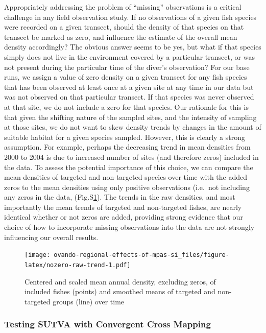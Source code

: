 \documentclass[]{article}
\begin{document}
Appropriately addressing the problem of ``missing'' observations is a critical challenge in any field observation study. If no observations of a given fish species were recorded on a given transect, should the density of that species on that transect be marked as zero, and influence the estimate of the overall mean density accordingly? The obvious answer seems to be yes, but what if that species simply does not live in the environment covered by a particular transect, or was not present during the particular time of the diver's observation? For our base runs, we assign a value of zero density on a given transect for any fish species that has been observed at least once at a given site at any time in our data but was not observed on that particular transect. If that species was never observed at that site, we do not include a zero for that species. Our rationale for this is that given the shifting nature of the sampled sites, and the intensity of sampling at those sites, we do not want to skew density trends by changes in the amount of suitable habitat for a given species sampled. However, this is clearly a strong assumption. For example, perhaps the decreasing trend in mean densities from 2000 to 2004 is due to increased number of sites (and therefore zeros) included in the data. To assess the potential importance of this choice, we can compare the mean densities of targeted and non-targeted species over time with the added zeros to the mean densities using only positive observations (i.e.~not including any zeros in the data, (Fig.S\ref{fig:nozero-raw-trend}). The trends in the raw densities, and most importantly the mean trends of targeted and non-targeted fishes, are nearly identical whether or not zeros are added, providing strong evidence that our choice of how to incorporate missing observations into the data are not strongly influencing our overall results.

\begin{figure}
\centering
\texttt{[image: ovando-regional-effects-of-mpas-si\_files/figure-latex/nozero-raw-trend-1.pdf]}
\caption{\label{fig:nozero-raw-trend}Centered and scaled mean annual density, excluding zeros, of included fishes (points) and smoothed means of targeted and non-targeted groups (line) over time}
\end{figure}

\hypertarget{testing-sutva-with-convergent-cross-mapping}{%
\subsubsection{Testing SUTVA with Convergent Cross Mapping}\label{testing-sutva-with-convergent-cross-mapping}}
\end{document}
